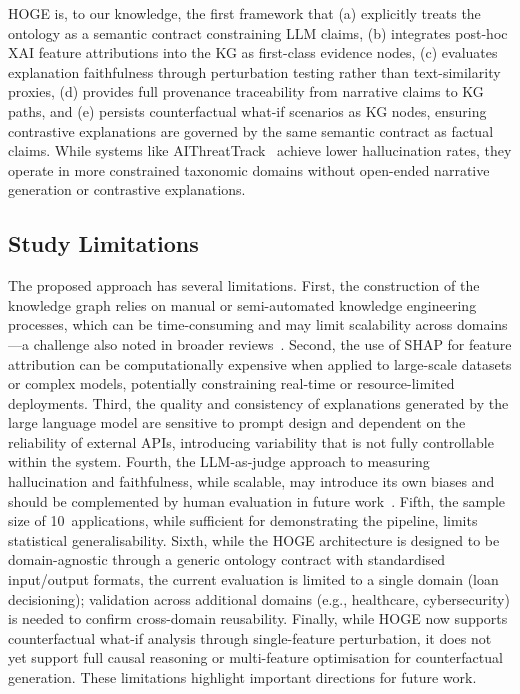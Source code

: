 \documentclass[lnbip]{svmultln}
\begin{document}
HOGE is, to our knowledge, the first framework that (a) explicitly treats the ontology as a semantic contract constraining LLM claims, (b) integrates post-hoc XAI feature attributions into the KG as first-class evidence nodes, (c) evaluates explanation faithfulness through perturbation testing rather than text-similarity proxies, (d) provides full provenance traceability from narrative claims to KG paths, and (e) persists counterfactual what-if scenarios as KG nodes, ensuring contrastive explanations are governed by the same semantic contract as factual claims. While systems like AIThreatTrack~\cite{threat2025} achieve lower hallucination rates, they operate in more constrained taxonomic domains without open-ended narrative generation or contrastive explanations.

\subsection{Study Limitations}
The proposed approach has several limitations. First, the construction of the knowledge graph relies on manual or semi-automated knowledge engineering processes, which can be time-consuming and may limit scalability across domains---a challenge also noted in broader reviews~\cite{macds2026}. Second, the use of SHAP for feature attribution can be computationally expensive when applied to large-scale datasets or complex models, potentially constraining real-time or resource-limited deployments. Third, the quality and consistency of explanations generated by the large language model are sensitive to prompt design and dependent on the reliability of external APIs, introducing variability that is not fully controllable within the system. Fourth, the LLM-as-judge approach to measuring hallucination and faithfulness, while scalable, may introduce its own biases and should be complemented by human evaluation in future work~\cite{cognet2025}. Fifth, the sample size of 10~applications, while sufficient for demonstrating the pipeline, limits statistical generalisability. Sixth, while the HOGE architecture is designed to be domain-agnostic through a generic ontology contract with standardised input/output formats, the current evaluation is limited to a single domain (loan decisioning); validation across additional domains (e.g., healthcare, cybersecurity) is needed to confirm cross-domain reusability. Finally, while HOGE now supports counterfactual what-if analysis through single-feature perturbation, it does not yet support full causal reasoning or multi-feature optimisation for counterfactual generation. These limitations highlight important directions for future work.
\end{document}

